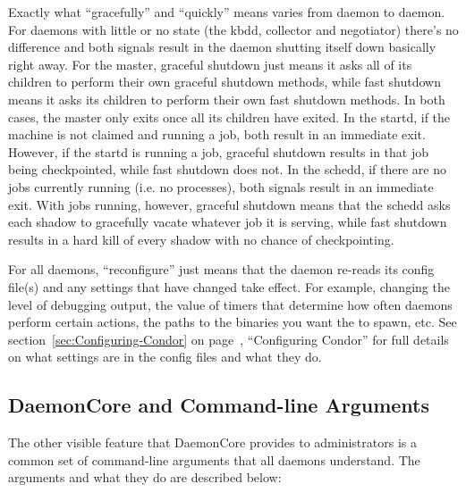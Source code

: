 Exactly what ``gracefully'' and ``quickly'' means varies from daemon
to daemon.  For daemons with little or no state (the kbdd, collector and
negotiator) there's no difference and both signals result in the
daemon shutting itself down basically right away.  For the master,
graceful shutdown just means it asks all of its children to perform
their own graceful shutdown methods, while fast shutdown means it asks
its children to perform their own fast shutdown methods.  In both
cases, the master only exits once all its children have exited.  In
the startd, if the machine is not claimed and running a job, both
result in an immediate exit.  However, if the startd is running a job,
graceful shutdown results in that job being checkpointed, while fast
shutdown does not.  In the schedd, if there are no jobs currently
running (i.e. no  processes), both signals result in an
immediate exit.  With jobs running, however, graceful shutdown means
that the schedd asks each shadow to gracefully vacate whatever job it
is serving, while fast shutdown results in a hard kill of every shadow
with no chance of checkpointing.  

For all daemons, ``reconfigure'' just means that the daemon re-reads
its config file(s) and any settings that have changed take effect.
For example, changing the level of debugging output, the value of
timers that determine how often daemons perform certain actions, the
paths to the binaries you want the  to spawn, etc.
See section~\ref{sec:Configuring-Condor} on
page~\pageref{sec:Configuring-Condor}, ``Configuring Condor'' for full
details on what settings are in the config files and what they do.

\subsection{\label{sec:DaemonCore-Arguments}DaemonCore and
Command-line Arguments} 

The other visible feature that DaemonCore provides to administrators
is a common set of command-line arguments that all daemons understand.
The arguments and what they do are described below:

